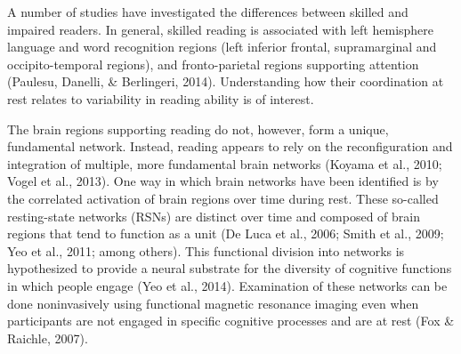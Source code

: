 
A number of studies have investigated the differences between skilled and impaired readers. In general, skilled reading is associated with left hemisphere language and word recognition regions (left inferior frontal, supramarginal and occipito-temporal regions), and fronto-parietal regions supporting attention (Paulesu, Danelli, & Berlingeri, 2014). Understanding how their coordination at rest relates to variability in reading ability is of interest. 

The brain regions supporting reading do not, however, form a unique, fundamental network. Instead, reading appears to rely on the reconfiguration and integration of multiple, more fundamental brain networks (Koyama et al., 2010; Vogel et al., 2013). One way in which brain networks have been identified is by the correlated activation of brain regions over time during rest.  These so-called resting-state networks (RSNs) are distinct over time and composed of brain regions that tend to function as a unit (De Luca et al., 2006; Smith et al., 2009; Yeo et al., 2011; among others). This functional division into networks is hypothesized to provide a neural substrate for the diversity of cognitive functions in which people engage (Yeo et al., 2014). Examination of these networks can be done noninvasively using functional magnetic resonance imaging even when participants are not engaged in specific cognitive processes and are at rest (Fox & Raichle, 2007). 

